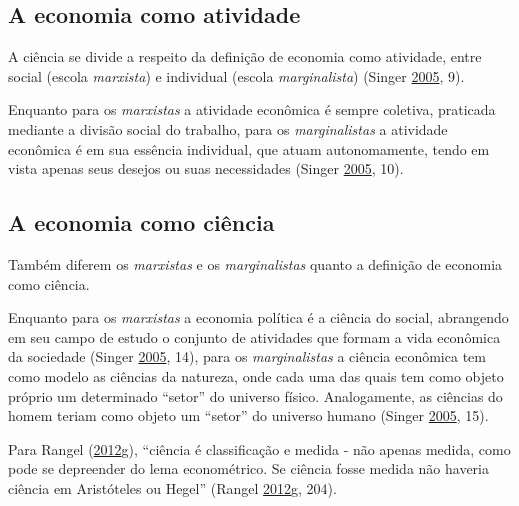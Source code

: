 \documentclass[
	12pt,				%
	oneside,			%
	a4paper,			%
	chapter=TITLE,		%
	section=TITLE,		%
	english,			%
	brazil				%
	]{abntex2}
\begin{document}
\hypertarget{a-economia-como-atividade}{%
\subsection{A economia como atividade}\label{a-economia-como-atividade}}

A ciência se divide a respeito da definição de economia como atividade, entre
social (escola \emph{marxista}) e individual (escola \emph{marginalista}) (Singer \protect\hyperlink{ref-singer}{2005}, 9).

Enquanto para os \emph{marxistas} a atividade econômica é sempre coletiva, praticada
mediante a divisão social do trabalho, para os \emph{marginalistas} a atividade
econômica é em sua essência individual, que atuam autonomamente, tendo em vista
apenas seus desejos ou suas necessidades (Singer \protect\hyperlink{ref-singer}{2005}, 10).

\hypertarget{a-economia-como-ciuxeancia}{%
\subsection{A economia como ciência}\label{a-economia-como-ciuxeancia}}

Também diferem os \emph{marxistas} e os \emph{marginalistas} quanto a definição de
economia como ciência.

Enquanto para os \emph{marxistas} a economia política é a ciência do social,
abrangendo em seu campo de estudo o conjunto de atividades que formam a vida
econômica da sociedade (Singer \protect\hyperlink{ref-singer}{2005}, 14), para os \emph{marginalistas} a
ciência econômica tem como modelo as ciências da natureza, onde cada uma das
quais tem como objeto próprio um determinado ``setor'' do universo físico.
Analogamente, as ciências do homem teriam como objeto um ``setor'' do universo
humano (Singer \protect\hyperlink{ref-singer}{2005}, 15).

Para Rangel (\protect\hyperlink{ref-rangel1956}{2012}\protect\hyperlink{ref-rangel1956}{g}), ``ciência é classificação e medida - não apenas medida, como
pode se depreender do lema econométrico. Se ciência fosse medida não haveria
ciência em Aristóteles ou Hegel'' (Rangel \protect\hyperlink{ref-rangel1956}{2012}\protect\hyperlink{ref-rangel1956}{g}, 204).
\end{document}
